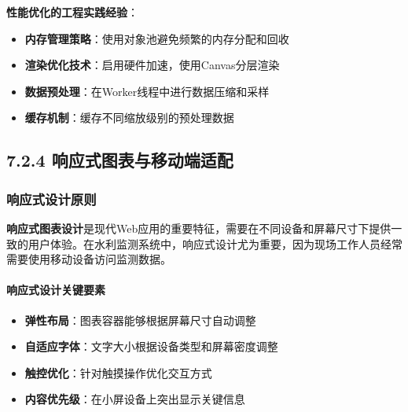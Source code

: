 \begin{Shaded}
\begin{Highlighting}[]
        \NormalTok{ [points[}\NormalTok{]}\OperatorTok{,}\NormalTok{ points[points} \OperatorTok{{-}} \NormalTok{]]}\OperatorTok{;}
\NormalTok{    \}}
\NormalTok{\}}
\end{Highlighting}
\end{Shaded}

\textbf{性能优化的工程实践经验}：

\begin{itemize}
\tightlist
\item
  \textbf{内存管理策略}：使用对象池避免频繁的内存分配和回收
\item
  \textbf{渲染优化技术}：启用硬件加速，使用Canvas分层渲染
\item
  \textbf{数据预处理}：在Worker线程中进行数据压缩和采样
\item
  \textbf{缓存机制}：缓存不同缩放级别的预处理数据
\end{itemize}

\subsection{7.2.4 响应式图表与移动端适配}\label{ux54cdux5e94ux5f0fux56feux8868ux4e0eux79fbux52a8ux7aefux9002ux914d}

\subsubsection{响应式设计原则}\label{ux54cdux5e94ux5f0fux8bbeux8ba1ux539fux5219}

\textbf{响应式图表设计}是现代Web应用的重要特征，需要在不同设备和屏幕尺寸下提供一致的用户体验。在水利监测系统中，响应式设计尤为重要，因为现场工作人员经常需要使用移动设备访问监测数据。

\paragraph{响应式设计关键要素}\label{ux54cdux5e94ux5f0fux8bbeux8ba1ux5173ux952eux8981ux7d20}

\begin{itemize}
\tightlist
\item
  \textbf{弹性布局}：图表容器能够根据屏幕尺寸自动调整
\item
  \textbf{自适应字体}：文字大小根据设备类型和屏幕密度调整
\item
  \textbf{触控优化}：针对触摸操作优化交互方式
\item
  \textbf{内容优先级}：在小屏设备上突出显示关键信息
\end{itemize}

